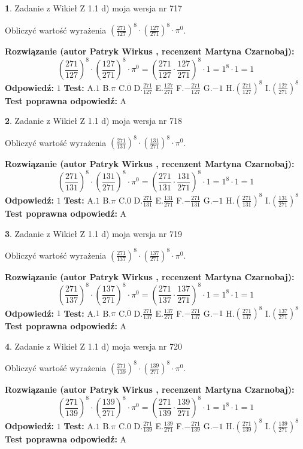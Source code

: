 \documentclass[12pt, a4paper]{article}
\theoremstyle{definition} %
\newtheorem{zad}{}
\newcommand{\zadStart}[1]{\begin{zad}#1\newline}
\newcommand{\zadStop}{\end{zad}}
\newcommand{\rozwStart}[2]{\noindent \textbf{Rozwiązanie (autor #1 , recenzent #2): }\newline}
\newcommand{\rozwStop}{\newline}
\newcommand{\odpStart}{\noindent \textbf{Odpowiedź:}\newline}
\newcommand{\odpStop}{\newline}
\newcommand{\testStart}{\noindent \textbf{Test:}\newline}
\newcommand{\testStop}{\newline}
\newcommand{\kluczStart}{\noindent \textbf{Test poprawna odpowiedź:}\newline}
\newcommand{\kluczStop}{\newline}
\begin{document}
\zadStart{Zadanie z Wikieł Z 1.1 d) moja wersja nr 717}

Obliczyć wartość wyrażenia $(\frac{271}{127})^{8} \cdot (\frac{127}{271})^{8} \cdot \pi^{0}$.
\zadStop
\rozwStart{Patryk Wirkus}{Martyna Czarnobaj}
$$(\frac{271}{127})^{8} \cdot (\frac{127}{271})^{8} \cdot \pi^{0} = (\frac{271}{127} \cdot \frac{127}{271})^{8} \cdot 1 = 1^{8} \cdot 1 = 1$$
\rozwStop
\odpStart
$1$
\odpStop
\testStart
A.$1$ B.$\pi$ C.$0$ D.$\frac{271}{127}$ E.$\frac{127}{271}$
F.$-\frac{271}{127}$ G.$-1$
H.$(\frac{271}{127})^{8}$
I.$(\frac{127}{271})^{8}$
\testStop
\kluczStart
A
\kluczStop



\zadStart{Zadanie z Wikieł Z 1.1 d) moja wersja nr 718}

Obliczyć wartość wyrażenia $(\frac{271}{131})^{8} \cdot (\frac{131}{271})^{8} \cdot \pi^{0}$.
\zadStop
\rozwStart{Patryk Wirkus}{Martyna Czarnobaj}
$$(\frac{271}{131})^{8} \cdot (\frac{131}{271})^{8} \cdot \pi^{0} = (\frac{271}{131} \cdot \frac{131}{271})^{8} \cdot 1 = 1^{8} \cdot 1 = 1$$
\rozwStop
\odpStart
$1$
\odpStop
\testStart
A.$1$ B.$\pi$ C.$0$ D.$\frac{271}{131}$ E.$\frac{131}{271}$
F.$-\frac{271}{131}$ G.$-1$
H.$(\frac{271}{131})^{8}$
I.$(\frac{131}{271})^{8}$
\testStop
\kluczStart
A
\kluczStop



\zadStart{Zadanie z Wikieł Z 1.1 d) moja wersja nr 719}

Obliczyć wartość wyrażenia $(\frac{271}{137})^{8} \cdot (\frac{137}{271})^{8} \cdot \pi^{0}$.
\zadStop
\rozwStart{Patryk Wirkus}{Martyna Czarnobaj}
$$(\frac{271}{137})^{8} \cdot (\frac{137}{271})^{8} \cdot \pi^{0} = (\frac{271}{137} \cdot \frac{137}{271})^{8} \cdot 1 = 1^{8} \cdot 1 = 1$$
\rozwStop
\odpStart
$1$
\odpStop
\testStart
A.$1$ B.$\pi$ C.$0$ D.$\frac{271}{137}$ E.$\frac{137}{271}$
F.$-\frac{271}{137}$ G.$-1$
H.$(\frac{271}{137})^{8}$
I.$(\frac{137}{271})^{8}$
\testStop
\kluczStart
A
\kluczStop



\zadStart{Zadanie z Wikieł Z 1.1 d) moja wersja nr 720}

Obliczyć wartość wyrażenia $(\frac{271}{139})^{8} \cdot (\frac{139}{271})^{8} \cdot \pi^{0}$.
\zadStop
\rozwStart{Patryk Wirkus}{Martyna Czarnobaj}
$$(\frac{271}{139})^{8} \cdot (\frac{139}{271})^{8} \cdot \pi^{0} = (\frac{271}{139} \cdot \frac{139}{271})^{8} \cdot 1 = 1^{8} \cdot 1 = 1$$
\rozwStop
\odpStart
$1$
\odpStop
\testStart
A.$1$ B.$\pi$ C.$0$ D.$\frac{271}{139}$ E.$\frac{139}{271}$
F.$-\frac{271}{139}$ G.$-1$
H.$(\frac{271}{139})^{8}$
I.$(\frac{139}{271})^{8}$
\testStop
\kluczStart
A
\kluczStop
\end{document}
